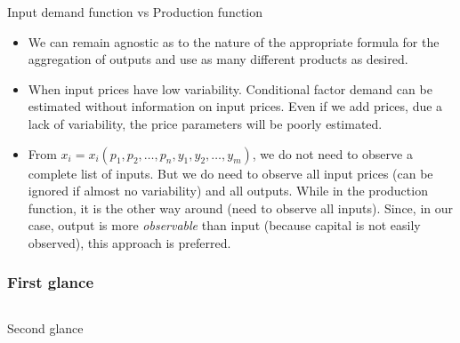 \documentclass[10pt,mathserif,aspectratio=169]{beamer}
\begin{document}
\begin{frame}[label=production]{Input demand function vs Production function}
  \begin{itemize}
    \item We can remain agnostic as to the nature of the appropriate formula for the
          aggregation of outputs and use as many different products as desired.
    \item When input prices have low variability. Conditional factor demand can be
          estimated without information on input prices. Even if we add prices, due a
          lack of variability, the price parameters will be poorly estimated.

    \item From $x_i = x_i(p_1, p_2, \ldots, p_n, y_1, y_2, \ldots, y_m)$, we do not need
          to observe a complete list of inputs. But we do need to observe all input
          prices (can be ignored if almost no variability) and all outputs. While in the
          production function, it is the other way around (need to observe all inputs).
          Since, in our case, output is more \textit{observable} than input (because
          capital is not easily observed), this approach is preferred.
  \end{itemize}
\end{frame}

\begin{frame}
  \frametitle{First glance}
  \begin{columns}[T,T]
    \makebox[\textwidth][c]{
      \fontsize{5pt}{5pt} \selectfont
      }

    \makebox[\textwidth][c]{
      \fontsize{5pt}{5pt} \selectfont
      }

  \end{columns}
\end{frame}

\begin{frame}[label=reg_sep]{Second glance}
  \begin{table}
    \fontsize{6pt}{6pt}\selectfont
    
  \end{table}
  \hyperlink{output}{}
\end{frame}
\end{document}
